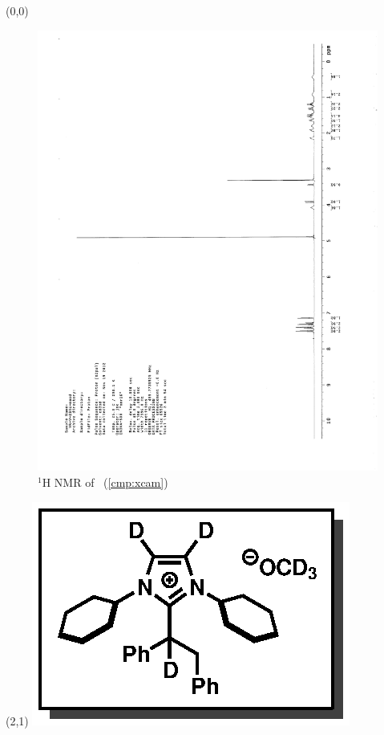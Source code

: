 \begin{textblock}{20}(0,0)
\begin{figure}[htb]
\caption{$^1$H NMR of \CMPxcam\ (\ref{cmp:xcam})}
\includegraphics[scale=0.75, trim = 0mm 0mm 0mm 5mm,
clip]{chp_alkylation/images/nmr/xcamH}
\vspace{-100pt}
\end{figure}
\end{textblock}
\begin{textblock}{1}(2,1)
\includegraphics[scale=0.8, angle=90]{chp_alkylation/images/xcam}
\end{textblock}

